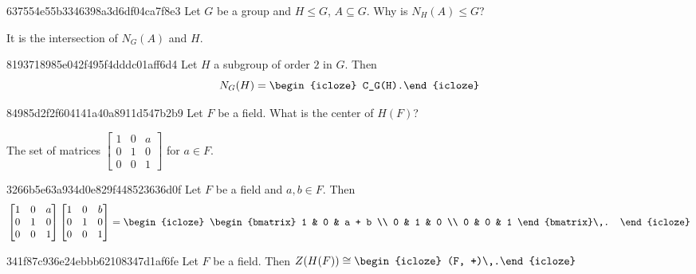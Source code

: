 \begin{note}{637554e55b3346398a3d6df04ca7f8e3}
    Let \({ G }\) be a group and \({ H \leq G }\), \({ A \subseteq G }\).
    Why is \({ N_H(A) \leq G }\)?

    \begin{cloze}{1}
        It is the intersection of \({ N_G(A) }\) and \({ H }\).
    \end{cloze}
\end{note}

\begin{note}{8193718985e042f495f4dddc01aff6d4}
    Let \({ H }\) a subgroup of order \({ 2 }\) in \({ G }\).
    Then
    \[
        N_G(H) = \begin{icloze}{1}C_G(H).\end{icloze}
    \]
\end{note}

\begin{note}{84985d2f2f604141a40a8911d547b2b9}
    Let \({ F }\) be a field.
    What is the center of \({ H(F) }\)?

    \begin{cloze}{1}
        The set of matrices
        \({
            \begin{bmatrix}
                1 & 0 & a \\
                0 & 1 & 0 \\
                0 & 0 & 1
            \end{bmatrix}
        }\)
        for \({ a \in F }\).
    \end{cloze}
\end{note}

\begin{note}{3266b5e63a934d0e829f448523636d0f}
    Let \({ F }\) be a field and \({ a, b \in F }\).
    Then
    \[
            \begin{bmatrix}
                1 & 0 & a \\
                0 & 1 & 0 \\
                0 & 0 & 1
            \end{bmatrix}
            \begin{bmatrix}
                1 & 0 & b \\
                0 & 1 & 0 \\
                0 & 0 & 1
            \end{bmatrix}
            =
            \begin{icloze}{1}
                \begin{bmatrix}
                    1 & 0 & a + b \\
                    0 & 1 & 0 \\
                    0 & 0 & 1
                \end{bmatrix}\,.
            \end{icloze}
    \]
\end{note}

\begin{note}{341f87c936e24ebbb62108347d1af6fe}
    Let \({ F }\) be a field.
    Then \({ Z(H(F)) \cong \begin{icloze}{1}(F, +)\,.\end{icloze} }\)
\end{note}


